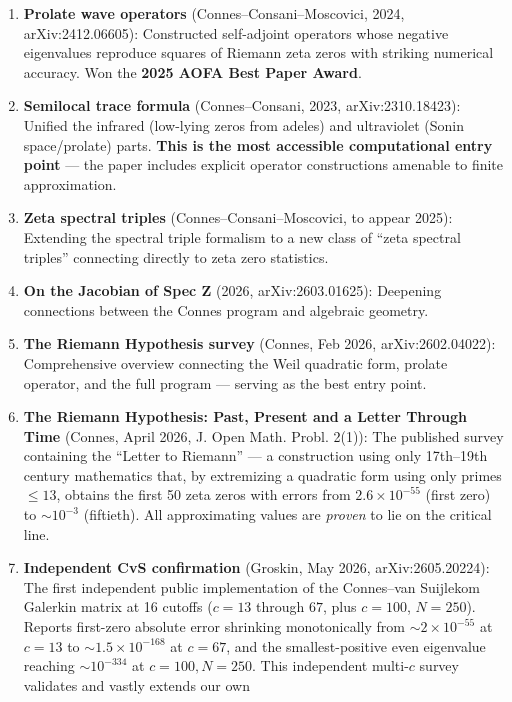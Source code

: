 \documentclass[
]{article}
\begin{document}
\begin{enumerate}
\def\labelenumi{\arabic{enumi}.}
\item
  \textbf{Prolate wave operators} (Connes--Consani--Moscovici, 2024,
  arXiv:2412.06605): Constructed self-adjoint operators whose negative
  eigenvalues reproduce squares of Riemann zeta zeros with striking
  numerical accuracy. Won the \textbf{2025 AOFA Best Paper Award}.
\item
  \textbf{Semilocal trace formula} (Connes--Consani, 2023,
  arXiv:2310.18423): Unified the infrared (low-lying zeros from adeles)
  and ultraviolet (Sonin space/prolate) parts. \textbf{This is the most
  accessible computational entry point} --- the paper includes explicit
  operator constructions amenable to finite approximation.
\item
  \textbf{Zeta spectral triples} (Connes--Consani--Moscovici, to appear
  2025): Extending the spectral triple formalism to a new class of
  ``zeta spectral triples'' connecting directly to zeta zero statistics.
\item
  \textbf{On the Jacobian of Spec Z} (2026, arXiv:2603.01625): Deepening
  connections between the Connes program and algebraic geometry.
\item
  \textbf{The Riemann Hypothesis survey} (Connes, Feb 2026,
  arXiv:2602.04022): Comprehensive overview connecting the Weil
  quadratic form, prolate operator, and the full program --- serving as
  the best entry point.
\item
  \textbf{The Riemann Hypothesis: Past, Present and a Letter Through
  Time} (Connes, April 2026, J. Open Math. Probl. 2(1)): The published
  survey containing the ``Letter to Riemann'' --- a construction using
  only 17th--19th century mathematics that, by extremizing a quadratic
  form using only primes \(\le 13\), obtains the first 50 zeta zeros
  with errors from \(2.6\times 10^{-55}\) (first zero) to
  \(\sim 10^{-3}\) (fiftieth). All approximating values are
  \emph{proven} to lie on the critical line.
\item
  \textbf{Independent CvS confirmation} (Groskin, May 2026,
  arXiv:2605.20224): The first independent public implementation of the
  Connes--van Suijlekom Galerkin matrix at 16 cutoffs (\(c=13\) through
  \(67\), plus \(c=100\), \(N=250\)). Reports first-zero absolute error
  shrinking monotonically from \(\sim 2\times 10^{-55}\) at \(c=13\) to
  \(\sim 1.5\times 10^{-168}\) at \(c=67\), and the smallest-positive
  even eigenvalue reaching \(\sim 10^{-334}\) at \(c=100,N=250\). This
  independent multi-\(c\) survey validates and vastly extends our own

\end{enumerate}
\end{document}
